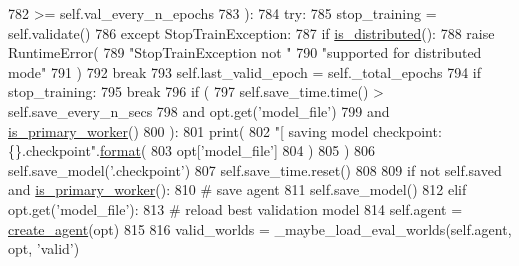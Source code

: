 \begin{DoxyCode}
782                     >= self.val\_every\_n\_epochs
783                 ):
784                     \textcolor{keywordflow}{try}:
785                         stop\_training = self.validate()
786                     \textcolor{keywordflow}{except} StopTrainException:
787                         \textcolor{keywordflow}{if} \hyperlink{namespaceparlai_1_1utils_1_1distributed_a023acb5e3b66e1f27e21247c35661279}{is\_distributed}():
788                             \textcolor{keywordflow}{raise} RuntimeError(
789                                 \textcolor{stringliteral}{"StopTrainException not "}
790                                 \textcolor{stringliteral}{"supported for distributed mode"}
791                             )
792                         \textcolor{keywordflow}{break}
793                     self.last\_valid\_epoch = self.\_total\_epochs
794                     \textcolor{keywordflow}{if} stop\_training:
795                         \textcolor{keywordflow}{break}
796                 \textcolor{keywordflow}{if} (
797                     self.save\_time.time() > self.save\_every\_n\_secs
798                     \textcolor{keywordflow}{and} opt.get(\textcolor{stringliteral}{'model\_file'})
799                     \textcolor{keywordflow}{and} \hyperlink{namespaceparlai_1_1utils_1_1distributed_a9bb1dac198180590ef8c6b6c6f9fc2c4}{is\_primary\_worker}()
800                 ):
801                     print(
802                         \textcolor{stringliteral}{"[ saving model checkpoint: \{\}.checkpoint"}.\hyperlink{namespaceparlai_1_1chat__service_1_1services_1_1messenger_1_1shared__utils_a32e2e2022b824fbaf80c747160b52a76}{format}(
803                             opt[\textcolor{stringliteral}{'model\_file'}]
804                         )
805                     )
806                     self.save\_model(\textcolor{stringliteral}{'.checkpoint'})
807                     self.save\_time.reset()
808 
809         \textcolor{keywordflow}{if} \textcolor{keywordflow}{not} self.saved \textcolor{keywordflow}{and} \hyperlink{namespaceparlai_1_1utils_1_1distributed_a9bb1dac198180590ef8c6b6c6f9fc2c4}{is\_primary\_worker}():
810             \textcolor{comment}{# save agent}
811             self.save\_model()
812         \textcolor{keywordflow}{elif} opt.get(\textcolor{stringliteral}{'model\_file'}):
813             \textcolor{comment}{# reload best validation model}
814             self.agent = \hyperlink{namespaceparlai_1_1core_1_1agents_ad0d54074d4bcc148bb415ab5515a53b5}{create\_agent}(opt)
815 
816         valid\_worlds = \_maybe\_load\_eval\_worlds(self.agent, opt, \textcolor{stringliteral}{'valid'})

\end{DoxyCode}
